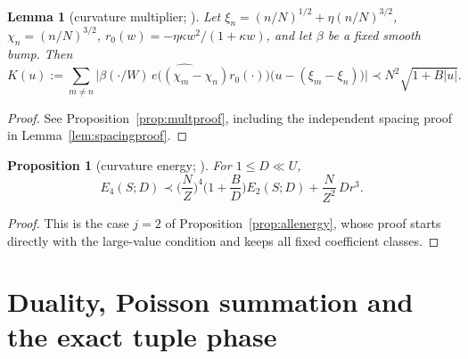 \documentclass[11pt]{amsart}
\newtheorem{proposition}[theorem]{Proposition}
\newtheorem{lemma}[theorem]{Lemma}
\theoremstyle{definition}
\theoremstyle{remark}
\numberwithin{equation}{section}
\begin{document}
\begin{lemma}[curvature multiplier; {\cite[\S2]{B38}}]\label{lem:mult}
Let $\xi_n=(n/N)^{1/2}+\eta(n/N)^{3/2}$, $\chi_n=(n/N)^{3/2}$, $r_0(w)=-\eta\kappa w^2/(1+\kappa w)$, and let $\beta$ be a fixed smooth bump. Then
\[
K(u):=\sum_{m\ne n}\Big|\widehat{\beta(\cdot/W)\,e\big((\chi_m-\chi_n)r_0(\cdot)\big)}\big(u-(\xi_m-\xi_n)\big)\Big|\prec N^2\sqrt{1+B|u|}.
\]
\end{lemma}

\begin{proof}
See Proposition~\ref{prop:multproof}, including the independent spacing proof in Lemma~\ref{lem:spacingproof}.
\end{proof}

\begin{proposition}[curvature energy; {\cite[Theorem~2]{B38}}]\label{prop:curv}
For $1\le D\ll U$,
\begin{equation}\label{eq:curv}
E_4(S;D)\prec\Big(\frac NZ\Big)^4\Big(1+\frac BD\Big)E_2(S;D)+\frac N{Z^2}\,Dr^3 .
\end{equation}
\end{proposition}

\begin{proof}
This is the case $j=2$ of Proposition~\ref{prop:allenergy}, whose proof starts directly with the large-value condition and keeps all fixed coefficient classes.
\end{proof}

\section{Duality, Poisson summation and the exact tuple phase}\label{sec:signed}
\end{document}
